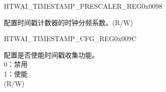 \begin{register}{H}{TWAI\_TIMESTAMP\_PRESCALER\_REG}{0x0098}\label{regdesc:TWAITIMESTAMPPRESCALERREG}
%
%
\regnewline%
\begin{regdesc}\begin{reglist}
\label{fielddesc:TWAITSDIVNUM}\item [TWAI\_TS\_DIV\_NUM] 配置时间戳计数器的时钟分频系数。(R/W)
\end{reglist}\end{regdesc}
\end{register}


\begin{register}{H}{TWAI\_TIMESTAMP\_CFG\_REG}{0x009C}\label{regdesc:TWAITIMESTAMPCFGREG}
%
%
\regnewline%
\begin{regdesc}\begin{reglist}
\label{fielddesc:TWAITSENABLE}\item [TWAI\_TS\_ENABLE] 配置是否使能时间戳收集功能。\\
0：禁用\\
1：使能\\
(R/W)
\end{reglist}\end{regdesc}
\end{register}
